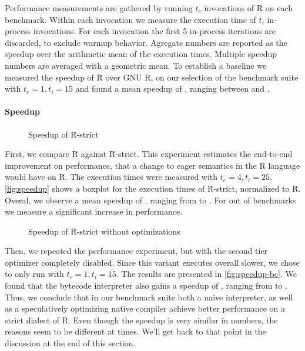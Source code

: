 \documentclass[review,nonacm,screen,acmsmall,anonymous=true]{acmart}
\renewcommand{\Rsh}{{\sf\u R}\xspace}
\newcommand{\Rshstrict}{{\sf\u R-strict}\xspace}
\begin{document}
Performance measurements are gathered by running $t_e$ invocations of \Rsh on
each benchmark. Within each invocation we measure the execution time of $t_i$
in-process invocations. For each invocation the first 5 in-process iterations
are discarded, to exclude warmup behavior. Agregate numbers are reported as the
speedup over the arithmetic mean of the execution times. Multiple speedup
numbers are averaged with a geometric mean. To establish a baseline we measured
the speedup of \Rsh over GNU R, on our selection of the benchmark suite with
$t_e = 1, t_i = 15$ and found a mean speedup of \speedupRsh, ranging between
\speedupRshMin and \speedupRshMax.

\paragraph{Speedup}

\begin{figure}[h]
  \centering
  
  \caption{Speedup of \Rshstrict}
  \label{fig:speedup}
\end{figure}

First, we compare \Rsh against \Rshstrict. This experiment estimates the end-to-end
improvement on performance, that a change to eager semantics in the R language
would have on \Rsh. The execution times were measured with $t_e = 4, t_i = 25$.
\autoref{fig:speedup} shows a boxplot for the execution times of \Rsh-strict,
normalized to \Rsh. Overal, we observe a mean speedup of
\speedupRshStrict, ranging from \speedupRshStrictMin to \speedupRshStrictMax.
For \speedupRshStrictSignificant out of \benchmarkSuiteSize benchmarks we measure a significant increase in performance.
%
\begin{figure}[h]
  \centering
  
  \caption{Speedup of \Rshstrict without optimizations}
  \label{fig:speedup-bc}
\end{figure}
%
Then, we repeated the performance experiment, but with the second tier
optimizer completely disabled. Since this variant executes overall \rshBCSlowdown
slower, we chose to only run with $t_e = 1, t_i = 15$.
The results are presented in \autoref{fig:speedup-bc}. We found that the bytecode
interpreter also gains a speedup of \speedupBCRshStrict, ranging from
\speedupBCRshStrictMin to \speedupBCRshStrictMax.
%
Thus, we conclude that in our benchmark suite both a naive interpreter, as well as a speculatively
optimizing native compiler achieve better performance on a strict dialect of R.
Even though the speedup is very similar in numbers, the reasons seem to be
different at times. We'll get back to that point in the discussion at the end of
this section.
\end{document}
